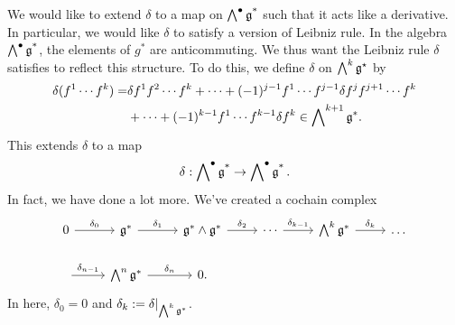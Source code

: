 We would like to extend $\delta$ to a map on $\operatorname{\bigwedge\nolimits^\bullet\mathfrak{g}^*}$ such that it acts like a derivative. In particular, we would like $\delta$ to satisfy a version of Leibniz rule. In the algebra $\operatorname{\bigwedge\nolimits^\bullet\mathfrak{g}^*}$, the elements of $g^*$ are anticommuting. We thus want the Leibniz rule $\delta$ satisfies to reflect this structure. To do this, we define $\delta$ on $\bigwedge\nolimits^k\mathfrak{g}^\star$ by
\begin{equation}\label{eq:leibniz_lie}
\begin{aligned}
\delta(f^1\cdots f^k)=&\delta f^1f^2\cdots f^k+\cdots+ (-1)^{j-1}f^1\cdots f^{j-1}\delta f^jf^{j+1}\cdots f^k\\
&+\cdots+(-1)^{k-1}f^1\cdots f^{k-1}\delta f^k\in\bigwedge\nolimits^{k+1}\mathfrak{g}^*.
\end{aligned}
\end{equation} 
This extends $\delta$ to a map
\begin{equation}
\delta:\operatorname{\bigwedge\nolimits^\bullet\mathfrak{g}^*}\rightarrow\operatorname{\bigwedge\nolimits^\bullet\mathfrak{g}^*}.
\end{equation}
In fact, we have done a lot more. We've created a cochain complex
\begin{equation}\label{eq:brst_lie}
\begin{tikzcd}
0\arrow[r,"\delta_0"]&\g^*\arrow[r,"\delta_1"]&\g^*\wedge\g^*\arrow[r,"\delta_2"]&\cdots\arrow[r,"\delta_{k-1}"]&\bigwedge\nolimits^{k}\g^*\arrow[r,"\delta_k"]&\dots\\
\arrow[r,"\delta_{n-1}"]&\bigwedge\nolimits^n\g^*\arrow[r,"\delta_n"]&0.
\end{tikzcd}
\end{equation}
In here, $\delta_0=0$ and $\delta_k:=\delta|_{\bigwedge^k\mathfrak{g}^*}$. 

